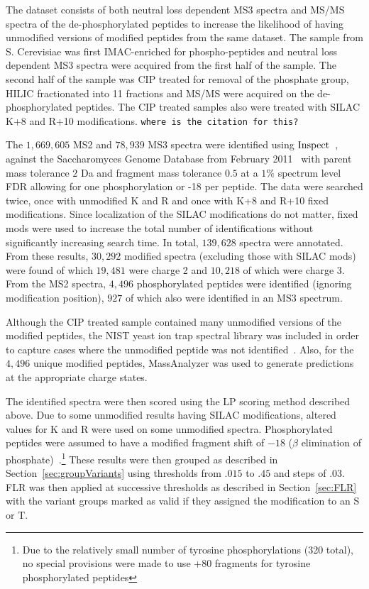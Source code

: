 \documentclass[11pt]{article}
\newcommand{\inspect}{${\rm Inspect}$}
\begin{document}
{The dataset consists of both neutral loss dependent MS3 spectra and MS/MS spectra of the de-phosphorylated peptides to increase the likelihood of having unmodified versions of modified peptides from the same dataset. The sample from S. Cerevisiae was first IMAC-enriched for phospho-peptides and neutral loss dependent MS3 spectra were acquired from the first half of the sample. The second half of the sample was CIP treated for removal of the phosphate group, HILIC fractionated into 11 fractions and MS/MS were acquired on the de-phosphorylated peptides. The CIP treated samples also were treated with SILAC K+8 and R+10 modifications. {\tt where is the citation for this? }

The $1,669,605$ MS2 and $78,939$ MS3 spectra were identified using {\inspect}~\cite{tanner05}, against the Saccharomyces Genome Database from February 2011~\cite{Cherry2012} with parent mass tolerance $2$ Da and fragment mass tolerance $0.5$ at a $1\%$ spectrum level FDR allowing for one phosphorylation or -18 per peptide. The data were searched twice, once with unmodified K and R and once with K+8 and R+10 fixed modifications. Since localization of the SILAC modifications do not matter, fixed mods were used to increase the total number of identifications without significantly increasing search time. In total, $139,628$ spectra were annotated. From these results, $30,292$ modified spectra (excluding those with SILAC mods) were found of which $19,481$ were charge 2 and $10,218$ of which were charge 3. From the MS2 spectra, $4,496$ phosphorylated peptides were identified (ignoring modification position), $927$ of which also were identified in an MS3 spectrum. 

Although the CIP treated sample contained many unmodified versions of the modified peptides, the NIST yeast ion trap spectral library was included in order to capture cases where the unmodified peptide was not identified~\cite{speclib_nist_human_yeast}. Also, for the $4,496$ unique modified peptides, MassAnalyzer was used to generate predictions~\cite{zhang04,zhang05,zhang10} at the appropriate charge states.

The identified spectra were then scored using the LP scoring method described above. Due to some unmodified results having SILAC modifications, altered values for K and R were used on some unmodified spectra. Phosphorylated peptides were assumed to have a modified fragment shift of $-18$ ($\beta$ elimination of phosphate)~\cite{Groenborg2002}.\footnote{Due to the relatively small number of tyrosine phosphorylations (320 total), no special provisions were made to use +80 fragments for tyrosine phosphorylated peptides} These results were then grouped as described in Section~\ref{sec:groupVariants} using thresholds from $.015$ to $.45$ and steps of $.03$. FLR was then applied at successive thresholds as described in Section~\ref{sec:FLR} with the variant groups marked as valid if they assigned the modification to an S or T.  

}
\end{document}
